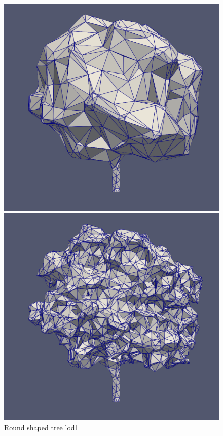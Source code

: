 \documentclass[12pt]{article}
\begin{document}
\begin{figure}[H]
    \centering
    \begin{minipage}{0.30\textwidth}
        \centering
        \includegraphics[width=1\textwidth]{images/tree-round_lod1.png}
        \caption{Round shaped tree lod1}
    \end{minipage}
    \begin{minipage}{0.30\textwidth}
        \centering
        \includegraphics[width=1\textwidth]{images/tree-round_lod2.png}

\end{minipage}
\end{figure}
\end{document}
